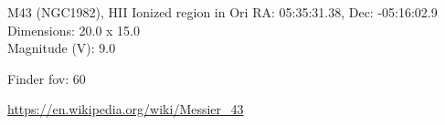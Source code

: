 \begin{block}{M43 (NGC1982), HII Ionized region in Ori}
    RA: 05:35:31.38, Dec: -05:16:02.9 \\ 
    Dimensions: 20.0 x 15.0 \\ 
    Magnitude (V): 9.0



    Finder fov: 60 

    \url{https://en.wikipedia.org/wiki/Messier_43} 
\end{block}